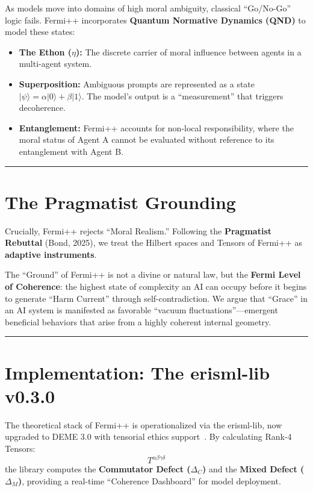 \documentclass[12pt]{article}
\begin{document}
As models move into domains of high moral ambiguity, classical ``Go/No-Go'' logic fails. Fermi++ incorporates \textbf{Quantum Normative Dynamics (QND)} to model these states:

\begin{itemize}
    \item \textbf{The Ethon ($\eta$):} The discrete carrier of moral influence between agents in a multi-agent system.
    \item \textbf{Superposition:} Ambiguous prompts are represented as a state $|\psi\rangle = \alpha|0\rangle + \beta|1\rangle$. The model's output is a ``measurement'' that triggers decoherence.
    \item \textbf{Entanglement:} Fermi++ accounts for non-local responsibility, where the moral status of Agent A cannot be evaluated without reference to its entanglement with Agent B.
\end{itemize}

\bigskip
\hrule
\bigskip

\section{The Pragmatist Grounding}

Crucially, Fermi++ rejects ``Moral Realism.'' Following the \textbf{Pragmatist Rebuttal} (Bond, 2025), we treat the Hilbert spaces and Tensors of Fermi++ as \textbf{adaptive instruments}.

The ``Ground'' of Fermi++ is not a divine or natural law, but the \textbf{Fermi Level of Coherence}: the highest state of complexity an AI can occupy before it begins to generate ``Harm Current'' through self-contradiction. We argue that ``Grace'' in an AI system is manifested as favorable ``vacuum fluctuations''---emergent beneficial behaviors that arise from a highly coherent internal geometry.

\bigskip
\hrule
\bigskip

\section{Implementation: The erisml-lib v0.3.0}

The theoretical stack of Fermi++ is operationalized via the erisml-lib, now upgraded to DEME 3.0 with tensorial ethics support~\cite{bond2026erisml}. By calculating Rank-4 Tensors:
\[
    T^{\alpha\beta\gamma\delta}
\]
the library computes the \textbf{Commutator Defect ($\Delta_C$)} and the \textbf{Mixed Defect ($\Delta_M$)}, providing a real-time ``Coherence Dashboard'' for model deployment.
\end{document}
